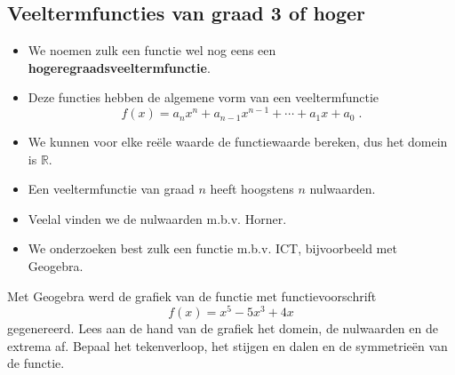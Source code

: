\documentclass[12pt]{article}
\begin{document}
\pagebreak
\subsection{Veeltermfuncties van graad 3 of hoger}

\begin{itemize}
  \item We noemen zulk een functie wel nog eens een {\bf hogeregraadsveeltermfunctie}.
  \item Deze functies hebben de algemene vorm van een veeltermfunctie
  $$f(x)= a_nx^n + a_{n-1}x^{n-1} + \cdots + a_1x + a_0\;.$$
  \item We kunnen voor elke reële waarde de functiewaarde bereken, dus het domein is $\mathbb{R}$.
  \item Een veeltermfunctie van graad $n$ heeft hoogstens $n$ nulwaarden. 
  \item Veelal vinden we de nulwaarden m.b.v. Horner.
  \item We onderzoeken best zulk een functie m.b.v. ICT, bijvoorbeeld met Geogebra.
\end{itemize}

\begin{oefening}
Met Geogebra werd de grafiek van de functie met functievoorschrift
$$f(x)=x^5-5x^3+4x$$ gegenereerd. Lees aan de hand van de grafiek het domein, de nulwaarden en de extrema af. Bepaal het tekenverloop, het stijgen en dalen en de symmetrieën van de functie.
\begin{center}
\end{center}
\end{oefening}
\end{document}

